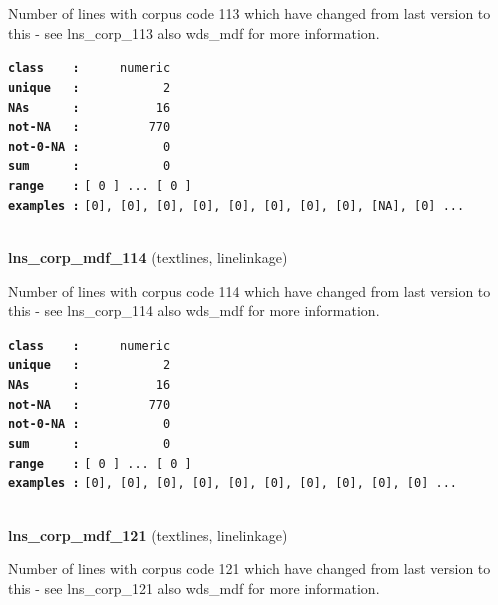 \documentclass[]{article}
\begin{document}
Number of lines with corpus code 113 which have changed from last
version to this - see lns\_corp\_113 also wds\_mdf for more information.

\textbf{\texttt{class\ \ \ \ :}} \texttt{~~~~~numeric}\\
\textbf{\texttt{unique\ \ \ :}} \texttt{~~~~~~~~~~~2}\\
\textbf{\texttt{NAs\ \ \ \ \ \ :}} \texttt{~~~~~~~~~~16}\\
\textbf{\texttt{not-NA\ \ \ :}} \texttt{~~~~~~~~~770}\\
\textbf{\texttt{not-0-NA\ :}} \texttt{~~~~~~~~~~~0}\\
\textbf{\texttt{sum\ \ \ \ \ \ :}} \texttt{~~~~~~~~~~~0}\\
\textbf{\texttt{range\ \ \ \ :}}
\texttt{{[}\ 0\ {]}\ ...\ {[}\ 0\ {]}}\\
\textbf{\texttt{examples\ :}}
\texttt{{[}0{]},\ {[}0{]},\ {[}0{]},\ {[}0{]},\ {[}0{]},\ {[}0{]},\ {[}0{]},\ {[}0{]},\ {[}NA{]},\ {[}0{]}\ ...}\\

~

\textbf{lns\_corp\_mdf\_114} (textlines, linelinkage)

Number of lines with corpus code 114 which have changed from last
version to this - see lns\_corp\_114 also wds\_mdf for more information.

\textbf{\texttt{class\ \ \ \ :}} \texttt{~~~~~numeric}\\
\textbf{\texttt{unique\ \ \ :}} \texttt{~~~~~~~~~~~2}\\
\textbf{\texttt{NAs\ \ \ \ \ \ :}} \texttt{~~~~~~~~~~16}\\
\textbf{\texttt{not-NA\ \ \ :}} \texttt{~~~~~~~~~770}\\
\textbf{\texttt{not-0-NA\ :}} \texttt{~~~~~~~~~~~0}\\
\textbf{\texttt{sum\ \ \ \ \ \ :}} \texttt{~~~~~~~~~~~0}\\
\textbf{\texttt{range\ \ \ \ :}}
\texttt{{[}\ 0\ {]}\ ...\ {[}\ 0\ {]}}\\
\textbf{\texttt{examples\ :}}
\texttt{{[}0{]},\ {[}0{]},\ {[}0{]},\ {[}0{]},\ {[}0{]},\ {[}0{]},\ {[}0{]},\ {[}0{]},\ {[}0{]},\ {[}0{]}\ ...}\\

~

\textbf{lns\_corp\_mdf\_121} (textlines, linelinkage)

Number of lines with corpus code 121 which have changed from last
version to this - see lns\_corp\_121 also wds\_mdf for more information.
\end{document}
